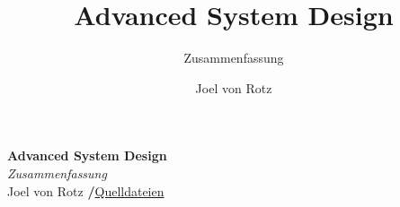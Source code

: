 \documentclass[
  10pt,
  a4paper,
  twocolumn]{article}
\title{Advanced System Design}
\subtitle{Zusammenfassung}
\author{Joel von Rotz}
\date{}
\begin{document}
  \raggedcolumns
  
\makeatletter
\begin{center}
  \vspace*{0.5cm}
  \textbf{\textsf{\Huge Advanced System Design}}\\
  \vspace{0.1cm}
  \textsf{\textit{\large Zusammenfassung}}\\
  \vspace{0.5cm}
  \textsf{\large Joel von
Rotz \hspace{0.3cm}\textbf{/}\hspace{0.3cm}\mbox{\large \faGithub\space \href{https://github.com/joelvonrotz/BSc-electrical-engineering/tree/main/semester\%206/advanced\%20system\%20design}{Quelldateien}}}
\end{center}
\makeatother
\normalfont





\ifdefined\Shaded
  \renewenvironment{Shaded}
    {\begin{tcolorbox}[
      rounded corners,
      colback={codebgcolor},
      colframe={codebgcolor},
      enhanced,
      boxrule=0mm,
      borderline={1pt}{0pt}{gray,dotted},
      left=0mm,
      breakable,
      overlay first={%
          \draw[thick,gray,line width=0.5pt,decoration={zigzag,segment length=4mm, amplitude=2mm/(2*sqrt(2))},decorate]
            (frame.south west) -- (frame.south east);
      },
      overlay middle={%
          \draw[thick,gray,line width=0.5pt,decoration={zigzag,segment length=4mm, amplitude=2mm/(2*sqrt(2))},decorate]
            (frame.south west) -- (frame.south east);
          \draw[thick,gray,line width=0.5pt,decoration={zigzag,segment length=4mm, amplitude=2mm/(2*sqrt(2))},decorate]
            (frame.north west) -- (frame.north east);
      },
      overlay last={%
          \draw[thick,gray,line width=0.5pt,decoration={zigzag,segment length=4mm, amplitude=2mm/(2*sqrt(2))},decorate]
            (frame.north west) -- (frame.north east);
      }
      ]}
    {\end{tcolorbox}}
\fi
\end{document}
